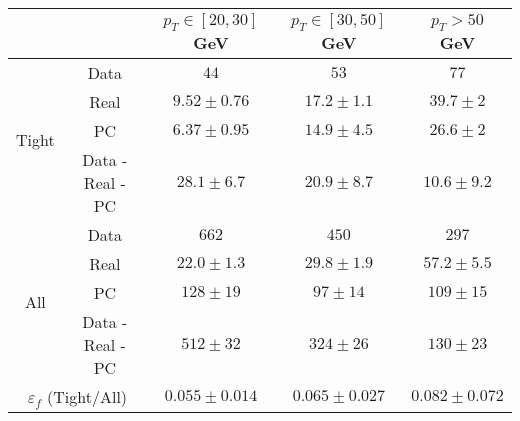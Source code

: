 \small
\begin{tabular}{|c|c||c|c|c|}
\hline
\multicolumn{2}{|c||}{} & $p_{T}\in[20,30]$ GeV & $p_{T}\in[30,50]$ GeV & $p_{T} > 50$ GeV\\ 
\hline
\hline
\multirow{4}{*}{Tight} & Data  &  $44$ &  $53$ &  $77$\\ 
&Real&   $9.52 \pm 0.76$ &  $17.2 \pm 1.1$ &  $39.7 \pm 2$\\ 
&PC &  $6.37 \pm 0.95$ &  $14.9 \pm 4.5$ &  $26.6 \pm 2$\\ 
\cline{2-5}
&Data - Real - PC &  $28.1 \pm 6.7$ &  $20.9 \pm 8.7$ &  $10.6 \pm 9.2$\\ 
\hline
\hline
\multirow{4}{*}{All} & Data  &  $662$ &  $450$ &  $297$\\ 
&Real&  $22.0 \pm 1.3$ &  $29.8 \pm 1.9$ &  $57.2 \pm 5.5$\\ 
&PC &  $128 \pm 19$ &  $ 97 \pm 14$ &  $109 \pm 15$\\ 
\cline{2-5}
&Data - Real - PC &  $512 \pm 32$ &  $324 \pm 26$ &  $130 \pm 23$\\ 
\hline
\hline
\multicolumn{2}{|c||}{$\varepsilon_f$ (Tight/All)} &  $0.055 \pm 0.014$ &  $0.065 \pm 0.027$ &  $0.082 \pm 0.072$\\ 
\hline
\end{tabular}
